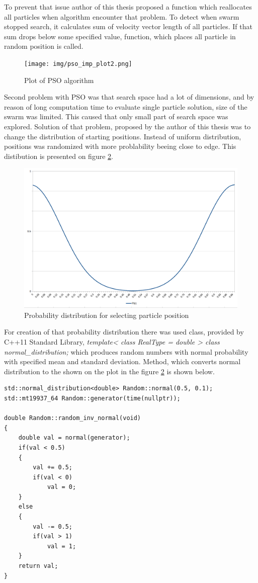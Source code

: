 To prevent that issue author of this thesis proposed a function which reallocates all particles when algorithm encounter that problem. 
To detect when swarm stopped search, it calculates sum of velocity vector length of all particles. 
If that sum drops below some specified value, function, which places all particle in random position is called. 
\begin{figure}[ht]
	\centering
	\texttt{[image: img/pso\_imp\_plot2.png]}
	\caption{Plot of PSO algorithm }
	\label{img_pso_imp_plot2}
\end{figure}

Second problem with PSO was that search space had a lot of dimensions, and by reason of long computation time to evaluate single particle solution, 
size of the swarm was limited. This caused that only small part of search space was explored. Solution of that problem, 
proposed by the author of this thesis was to change the distribution of starting positions. Instead of uniform distribution, positions was randomized 
with more problability beeing close to edge. This distibution is presented on figure \ref{img_pso_imp_dist}.

\begin{figure}[ht]
	\centering
	\includegraphics[scale=0.4]{img/pso_dist.png}
	\caption{Probability distribution for selecting particle position}
	\label{img_pso_imp_dist}
\end{figure}

For creation of that probability distribution there was used class, provided by C++11 Standard Library, 
\textit{template< class RealType = double > class normal\_distribution;} which produces random numbers with normal probability
with specified mean and standard deviation. Method, which converts normal distribution to the shown on the plot in the figure \ref{img_pso_imp_dist} 
is shown below.

\begin{lstlisting}
std::normal_distribution<double> Random::normal(0.5, 0.1);
std::mt19937_64 Random::generator(time(nullptr));

double Random::random_inv_normal(void)
{
    double val = normal(generator);
    if(val < 0.5)
    {
        val += 0.5;
        if(val < 0)
            val = 0;
    }
    else
    {
        val -= 0.5;
        if(val > 1)
            val = 1;
    }
    return val;
}
\end{lstlisting}